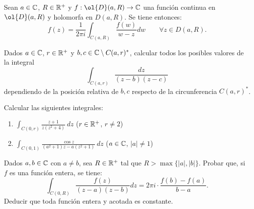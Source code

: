 \begin{ejercicio}
    Sean $a \in \mathbb{C}$, $R \in \mathbb{R}^+$ y $f : \ol{D}(a,R) \to \bb{C}$ una función continua en $\ol{D}(a,R)$ y holomorfa en $D(a,R)$. Se tiene entonces:
    \[
        f(z) = \frac{1}{2\pi i} \int_{C(a,R)} \frac{f(w)}{w-z}dw \qquad \forall z \in D(a,R).
    \]
\end{ejercicio}

\begin{ejercicio}
    Dados $a \in \mathbb{C}$, $r \in \mathbb{R}^+$ y $b,c \in \mathbb{C}\setminus C(a,r)^\ast$, calcular todos los posibles valores de la integral
    \[
        \int_{C(a,r)} \frac{dz}{(z-b)(z-c)}
    \]
    dependiendo de la posición relativa de $b,c$ respecto de la circunferencia $C(a,r)^\ast$.
\end{ejercicio}

\begin{ejercicio}
    Calcular las siguientes integrales:
    \begin{enumerate}
        \item $\displaystyle\int_{C(0,r)} \frac{z+1}{z(z^2+4)}\ dz$ \qquad ($r \in \mathbb{R}^+$, $r \neq 2$)
        \item $\displaystyle\int_{C(0,1)} \frac{\cos z}{(a^2+1)z - a(z^2+1)}\ dz$ \qquad ($a \in \mathbb{C}$, $|a| \neq 1$)
    \end{enumerate}
\end{ejercicio}

\begin{ejercicio}
    Dados $a,b \in \mathbb{C}$ con $a \neq b$, sea $R \in \mathbb{R}^+$ tal que $R > \max\{|a|,|b|\}$. Probar que, si $f$ es una función entera, se tiene:
    \[
        \int_{C(0,R)} \frac{f(z)}{(z-a)(z-b)}dz = 2\pi i \cdot \frac{f(b)-f(a)}{b-a}.
    \]
    Deducir que toda función entera y acotada es constante.
\end{ejercicio}